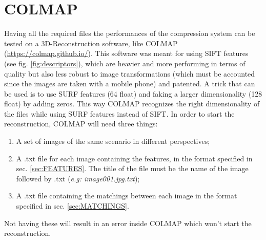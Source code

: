 
\section{COLMAP} \label{sec:COLMAP}
Having all the required files the performances of the compression system can be tested on a 3D-Reconstruction software, like COLMAP (\url{https://colmap.github.io/}). This software was meant for using SIFT features (see fig. \ref{fig:descriptors}), which are heavier and more performing in terms of quality but also less robust to image transformations (which must be accounted since the images are taken with a mobile phone) and patented. A trick that can be used is to use SURF features (64 float) and faking a larger dimensionality (128 float) by adding zeros. This way COLMAP recognizes the right dimensionality of the files while using SURF features instead of SIFT. In order to start the reconstruction, COLMAP will need three things:
\begin{enumerate}
\item A set of images of the same scenario in different perspectives;
\item A .txt file for each image containing the features, in the format specified in sec. \ref{sec:FEATURES}. The title of the file must be the name of the image followed by .txt (\emph{e.g: image001.jpg.txt});
\item A .txt file containing the matchings between each image in the format specified in sec. \ref{sec:MATCHINGS}.
\end{enumerate}
Not having these will result in an error inside COLMAP which won't start the reconstruction.

